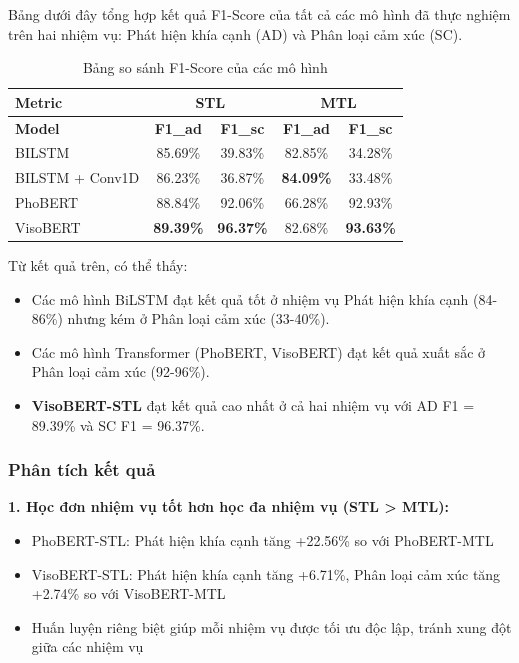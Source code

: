 Bảng dưới đây tổng hợp kết quả F1-Score của tất cả các mô hình đã thực nghiệm trên hai nhiệm vụ: Phát hiện khía cạnh (AD) và Phân loại cảm xúc (SC).

\begin{table}[H]
\centering
\begin{tabular}{|l|c|c|c|c|}
\hline
\textbf{Metric} & \multicolumn{2}{c|}{\textbf{STL}} & \multicolumn{2}{c|}{\textbf{MTL}} \\
\hline
\textbf{Model} & \textbf{F1\_ad} & \textbf{F1\_sc} & \textbf{F1\_ad} & \textbf{F1\_sc} \\
\hline
BILSTM & 85.69\% & 39.83\% & 82.85\% & 34.28\% \\
\hline
BILSTM + Conv1D & 86.23\% & 36.87\% & \textbf{84.09\%} & 33.48\% \\
\hline
PhoBERT & 88.84\% & 92.06\% & 66.28\% & 92.93\% \\
\hline
VisoBERT & \textbf{89.39\%} & \textbf{96.37\%} & 82.68\% & \textbf{93.63\%} \\
\hline
\end{tabular}
\caption{Bảng so sánh F1-Score của các mô hình}
\label{tab:comparison-all}
\end{table}

Từ kết quả trên, có thể thấy:
\begin{itemize}
    \item Các mô hình BiLSTM đạt kết quả tốt ở nhiệm vụ Phát hiện khía cạnh (84-86\%) nhưng kém ở Phân loại cảm xúc (33-40\%).
    \item Các mô hình Transformer (PhoBERT, VisoBERT) đạt kết quả xuất sắc ở Phân loại cảm xúc (92-96\%).
    \item \textbf{VisoBERT-STL} đạt kết quả cao nhất ở cả hai nhiệm vụ với AD F1 = 89.39\% và SC F1 = 96.37\%.
\end{itemize}

\subsubsection{Phân tích kết quả}

\textbf{1. Học đơn nhiệm vụ tốt hơn học đa nhiệm vụ (STL > MTL):}
\begin{itemize}
    \item PhoBERT-STL: Phát hiện khía cạnh tăng +22.56\% so với PhoBERT-MTL
    \item VisoBERT-STL: Phát hiện khía cạnh tăng +6.71\%, Phân loại cảm xúc tăng +2.74\% so với VisoBERT-MTL
    \item Huấn luyện riêng biệt giúp mỗi nhiệm vụ được tối ưu độc lập, tránh xung đột giữa các nhiệm vụ
\end{itemize}

